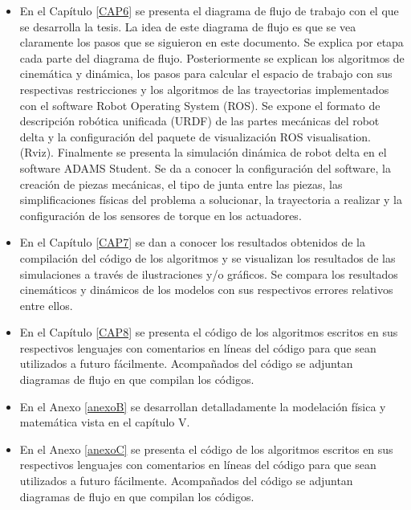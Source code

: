\begin{itemize}
    \item {En el Capítulo \eqref{CAP6} se presenta el diagrama de flujo de trabajo con el que se desarrolla la tesis. La idea de este diagrama de flujo es que se vea claramente los pasos que se siguieron en este documento. Se explica por etapa cada parte del diagrama de flujo. Posteriormente se explican los algoritmos de cinemática y dinámica, los pasos para calcular el espacio de trabajo con sus respectivas restricciones y los algoritmos de las trayectorias implementados con el software Robot Operating System (ROS). Se expone el formato de descripción robótica unificada (URDF) de las partes mecánicas del robot delta y la configuración del paquete de visualización ROS visualisation. (Rviz). Finalmente se presenta la simulación dinámica de robot delta en el software ADAMS Student. Se da a conocer la configuración del software, la creación de piezas mecánicas, el tipo de junta entre las piezas, las simplificaciones físicas del problema a solucionar, la trayectoria a realizar y la configuración de los sensores de torque en los actuadores.}
    \item {En el Capítulo \eqref{CAP7} se dan a conocer los resultados obtenidos de la compilación del código de los algoritmos y se visualizan los resultados de las simulaciones a través de ilustraciones y/o gráficos. Se compara los resultados cinemáticos y dinámicos de los modelos con sus respectivos errores relativos entre ellos.  }
    \item {En el Capítulo \eqref{CAP8} se presenta el código de los algoritmos escritos en sus respectivos lenguajes con comentarios en líneas del código para que sean utilizados a futuro fácilmente. Acompañados del código se adjuntan diagramas de flujo en que compilan los códigos.}
    \item {En el Anexo \eqref{anexoB} se desarrollan detalladamente la modelación física y matemática vista en el capítulo V.} 
    \item {En el Anexo \eqref{anexoC} se presenta el código de los algoritmos escritos en sus respectivos lenguajes con comentarios en líneas del código para que sean utilizados a futuro fácilmente. Acompañados del código se adjuntan diagramas de flujo en que compilan los códigos.} 
    \end{itemize}